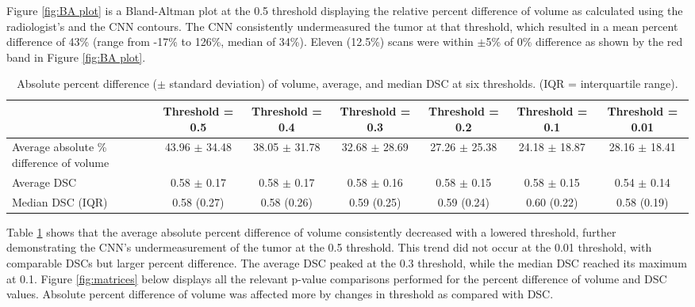 \documentclass{article}
\begin{document}
Figure \ref{fig:BA plot} is a Bland-Altman plot \cite{BlandAltman} at the 0.5 threshold displaying the relative percent difference of volume as calculated using the radiologist’s and the CNN contours. The CNN consistently undermeasured the tumor at that threshold, which resulted in a mean percent difference of 43\% (range from -17\% to 126\%, median of 34\%). Eleven (12.5\%) scans were within $\pm$5\% of 0\% difference as shown by the red band in Figure \ref{fig:BA plot}. 

\begin{table}[H]
\centering
\caption{Absolute percent difference ($\pm$ standard deviation) of volume, average, and median DSC at six thresholds. (IQR = interquartile range).}
\label{tab:full datainfo}
\begin{adjustbox}{width=1\textwidth}
{\renewcommand{\arraystretch}{2}
\begin{tabular}{l c c c c c c}
\toprule
     & \multicolumn{1}{c}{Threshold = 0.5} & \multicolumn{1}{c}{Threshold = 0.4} & \multicolumn{1}{c}{Threshold = 0.3} & \multicolumn{1}{c}{Threshold = 0.2}  & \multicolumn{1}{c}{Threshold = 0.1} & \multicolumn{1}{c}{Threshold = 0.01} \\ \midrule
Average absolute \% difference of volume & 43.96 $\pm$ 34.48 & 38.05 $\pm$ 31.78 & 32.68 $\pm$ 28.69 & 27.26 $\pm$ 25.38 & 24.18 $\pm$ 18.87 & 28.16 $\pm$ 18.41 \\
Average DSC & 0.58 $\pm$ 0.17 & 0.58 $\pm$ 0.17 & 0.58 $\pm$ 0.16 & 0.58 $\pm$ 0.15 & 0.58 $\pm$ 0.15 & 0.54 $\pm$ 0.14 \\
Median DSC (IQR) & 0.58 (0.27) & 0.58 (0.26) & 0.59 (0.25) & 0.59 (0.24) & 0.60 (0.22) & 0.58 (0.19) \\ \bottomrule
\end{tabular}}
\end{adjustbox}
\end{table}
Table \ref{tab:full datainfo} shows that the average absolute percent difference of volume consistently decreased with a lowered threshold, further demonstrating the CNN’s undermeasurement of the tumor at the 0.5 threshold. This trend did not occur at the 0.01 threshold, with comparable DSCs but larger percent difference. The average DSC peaked at the 0.3 threshold, while the median DSC reached its maximum at 0.1. Figure \ref{fig:matrices} below displays all the relevant p-value comparisons performed for the percent difference of volume and DSC values. Absolute percent difference of volume was affected more by changes in threshold as compared with DSC. 
\end{document}
